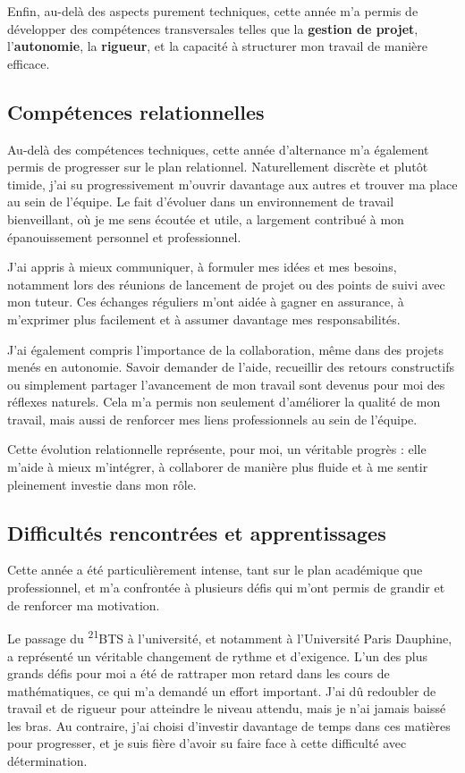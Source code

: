 Enfin, au-delà des aspects purement techniques, cette année m’a permis de développer des compétences transversales telles que la \textbf{gestion de projet}, l’\textbf{autonomie}, la \textbf{rigueur}, et la capacité à structurer mon travail de manière efficace.

\subsection{Compétences relationnelles}

Au-delà des compétences techniques, cette année d’alternance m’a également permis de progresser sur le plan relationnel. Naturellement discrète et plutôt timide, j’ai su progressivement m’ouvrir davantage aux autres et trouver ma place au sein de l’équipe. Le fait d’évoluer dans un environnement de travail bienveillant, où je me sens écoutée et utile, a largement contribué à mon épanouissement personnel et professionnel.

J’ai appris à mieux communiquer, à formuler mes idées et mes besoins, notamment lors des réunions de lancement de projet ou des points de suivi avec mon tuteur. Ces échanges réguliers m’ont aidée à gagner en assurance, à m’exprimer plus facilement et à assumer davantage mes responsabilités.

J’ai également compris l’importance de la collaboration, même dans des projets menés en autonomie. Savoir demander de l’aide, recueillir des retours constructifs ou simplement partager l’avancement de mon travail sont devenus pour moi des réflexes naturels. Cela m’a permis non seulement d’améliorer la qualité de mon travail, mais aussi de renforcer mes liens professionnels au sein de l’équipe.

Cette évolution relationnelle représente, pour moi, un véritable progrès : elle m’aide à mieux m’intégrer, à collaborer de manière plus fluide et à me sentir pleinement investie dans mon rôle.

\subsection{Difficultés rencontrées et apprentissages}

Cette année a été particulièrement intense, tant sur le plan académique que professionnel, et m’a confrontée à plusieurs défis qui m’ont permis de grandir et de renforcer ma motivation.

Le passage du \textsc{\textsuperscript{21}BTS} à l’université, et notamment à l’Université Paris Dauphine, a représenté un véritable changement de rythme et d’exigence. L’un des plus grands défis pour moi a été de rattraper mon retard dans les cours de mathématiques, ce qui m’a demandé un effort important. J’ai dû redoubler de travail et de rigueur pour atteindre le niveau attendu, mais je n’ai jamais baissé les bras. Au contraire, j’ai choisi d’investir davantage de temps dans ces matières pour progresser, et je suis fière d’avoir su faire face à cette difficulté avec détermination.

